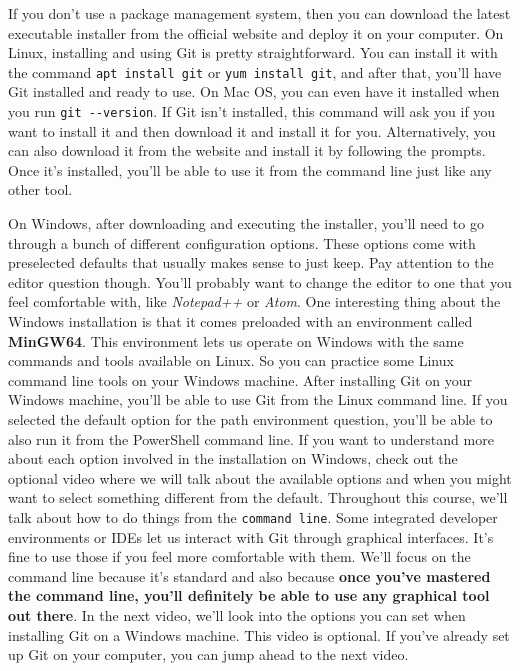 	If you don't use a package management system, then you can download the latest executable installer from the official website and deploy it on your computer. On Linux, installing and using Git is pretty straightforward. You can install it with the command \texttt{apt install git} or \texttt{yum install git}, and after that, you'll have Git installed and ready to use. On Mac OS, you can even have it installed when you run \verb|git --version|. If Git isn't installed, this command will ask you if you want to install it and then download it and install it for you. Alternatively, you can also download it from the website and install it by following the prompts. Once it's installed, you'll be able to use it from the command line just like any other tool. 
	
	On Windows, after downloading and executing the installer, you'll need to go through a bunch of different configuration options. 
	These options come with preselected defaults that usually makes sense to just keep. Pay attention to the editor question though. You'll probably want to change the editor to one that you feel comfortable with, like \textit{Notepad++} or \textit{Atom}. 
	One interesting thing about the Windows installation is that it comes preloaded with an environment called \textbf{MinGW64}. This environment lets us operate on Windows with the same commands and tools available on Linux. So you can practice some Linux command line tools on your Windows machine. After installing Git on your Windows machine, you'll be able to use Git from the Linux command line. 
	If you selected the default option for the path environment question, you'll be able to also run it from the PowerShell command line. If you want to understand more about each option involved in the installation on Windows, check out the optional video where we will talk about the available options and when you might want to select something different from the default. Throughout this course, we'll talk about how to do things from the \texttt{command line}. Some integrated developer environments or IDEs let us interact with Git through graphical interfaces. It's fine to use those if you feel more comfortable with them. We'll focus on the command line because it's standard and also because \textbf{once you've mastered the command line, you'll definitely be able to use any graphical tool out there}. In the next video, we'll look into the options you can set when installing Git on a Windows machine. This video is optional. If you've already set up Git on your computer, you can jump ahead to the next video.
	
